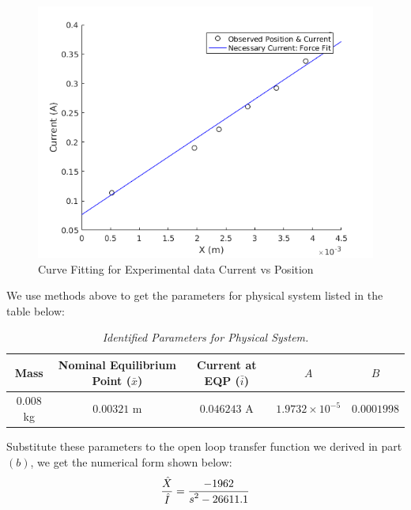 \documentclass[letterpaper]{article}
\begin{document}
\begin{figure}[H]
	\centering
	\includegraphics[scale=0.6]{parameterID/Magnet/current_position.png}
	\caption{Curve Fitting for Experimental data Current vs Position}
\end{figure}
We use methods above to get the parameters for physical system listed in the table below:
\begin{table}[H]
\begin{center}
    \begin{tabular}{|c|c|c|c|c|}
        \hline
        Mass & Nominal Equilibrium Point ($\bar{x}$) & Current at EQP ($\bar{i}$) & $A$ & $B$ \\ \hline
        $0.008$ kg   & $0.00321$ m & $0.046243$ A & $1.9732\times10^{-5}$ & $0.0001998$   \\ 
        \hline
    \end{tabular}
\caption{\emph{Identified Parameters for Physical System.}}
\label{Q1_dt5}
\end{center}
\end{table}
Substitute these parameters to the open loop transfer function we derived in part $\left(b\right)$, we get the numerical form shown below:
$$\frac{\displaystyle \hat{X}}{\displaystyle \hat{I}} = \frac{\displaystyle -1962}{\displaystyle s^2 - 26611.1}$$
\end{document}
